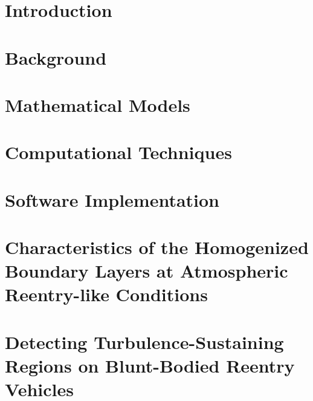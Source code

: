 \documentclass[final,letterpaper,12pt]{report}    %
\theoremstyle{definition}
\theoremstyle{remark}
\begin{document}
%
%
\chapter{Introduction}


\chapter{Background}


\chapter{Mathematical Models}


\chapter{Computational Techniques}


\chapter{Software Implementation}


\chapter[Characteristics of the Homogenized Boundary Layers\\ at Atmospheric Reentry-like Conditions]
        {Characteristics of the Homogenized Boundary Layers at Atmospheric Reentry-like Conditions}


\chapter[Detecting Turbulence-Sustaining Regions\\ on Blunt-Bodied Reentry Vehicles]
        {Detecting Turbulence-Sustaining Regions on Blunt-Bodied Reentry Vehicles}

\end{document}
